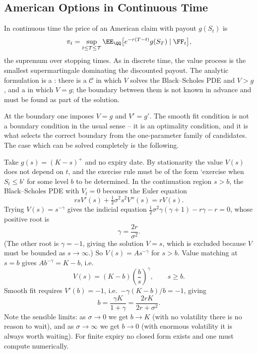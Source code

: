 \subsection{American Options in Continuous Time}

In continuous time the price of an American claim with payout $g(S_t)$ is
$$
\pi_t = \sup_{t\leq T\leq \mathcal{T}}\EE_\QQ\big[e^{-r(T-t)}g(S_T)\mid\FF_t\big],
$$
the supremum over stopping times. As in discrete time, the value process is the smallest supermartingale dominating the discounted payout. The analytic formulation is a : there is a  $\mathcal{C}$ in which $V$ solves the Black--Scholes PDE and $V > g$, and a  in which $V = g$; the boundary between them is not known in advance and must be found as part of the solution.

At the boundary one imposes  $V = g$ and  $V' = g'$. The smooth fit condition is not a boundary condition in the usual sense -- it is an optimality condition, and it is what selects the correct boundary from the one-parameter family of candidates. The case which can be solved completely is the following.

\begin{example}
	Take $g(s) = (K-s)^+$ and no expiry date. By stationarity the value $V(s)$ does not depend on $t$, and the exercise rule must be of the form `exercise when $S_t \leq b$' for some level $b$ to be determined. In the continuation region $s > b$, the Black--Scholes PDE with $V_t = 0$ becomes the Euler equation
	$$
	rsV'(s) + \tfrac12\sigma^2s^2V''(s) = rV(s).
	$$
	Trying $V(s) = s^{-\gamma}$ gives the indicial equation $\tfrac12\sigma^2\gamma(\gamma+1) - r\gamma - r = 0$, whose positive root is
	$$
	\gamma = \frac{2r}{\sigma^2}.
	$$
	(The other root is $\gamma = -1$, giving the solution $V = s$, which is excluded because $V$ must be bounded as $s\to\infty$.) So $V(s) = A s^{-\gamma}$ for $s > b$. Value matching at $s = b$ gives $Ab^{-\gamma} = K - b$, i.e.
	$$
	V(s) = (K-b)\left(\frac{b}{s}\right)^{\gamma}, \qquad s \geq b.
	$$
	Smooth fit requires $V'(b) = -1$, i.e.\ $-\gamma(K-b)/b = -1$, giving
	$$
	b = \frac{\gamma K}{1+\gamma} = \frac{2rK}{2r+\sigma^2}.
	$$
	Note the sensible limits: as $\sigma\to0$ we get $b \to K$ (with no volatility there is no reason to wait), and as $\sigma\to\infty$ we get $b\to0$ (with enormous volatility it is always worth waiting). For finite expiry no closed form exists and one must compute numerically.
\end{example}

